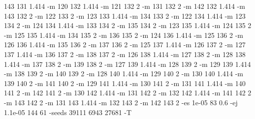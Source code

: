 \documentclass[12pt]{article}
\begin{document}
143 131 1.414 -m 120 132 1.414 -m 121 132 2 -m 131 132 2 -m 142 132 1.414 -m 143 132 2 -m 122 133 2 -m 123 133 1.414 -m 134 133 2 -m 122 134 1.414 -m 123 134 2 -m 124 134 1.414 -m 133 134 2 -m 135 134 2 -m 123 135 1.414 -m 124 135 2 -m 125 135 1.414 -m 134 135 2 -m 136 135 2 -m 124 136 1.414 -m 125 136 2 -m 126 136 1.414 -m 135 136 2 -m 137 136 2 -m 125 137 1.414 -m 126 137 2 -m 127 137 1.414 -m 136 137 2 -m 138 137 2 -m 126 138 1.414 -m 127 138 2 -m 128 138 1.414 -m 137 138 2 -m 139 138 2 -m 127 139 1.414 -m 128 139 2 -m 129 139 1.414 -m 138 139 2 -m 140 139 2 -m 128 140 1.414 -m 129 140 2 -m 130 140 1.414 -m 139 140 2 -m 141 140 2 -m 129 141 1.414 -m 130 141 2 -m 131 141 1.414 -m 140 141 2 -m 142 141 2 -m 130 142 1.414 -m 131 142 2 -m 132 142 1.414 -m 141 142 2 -m 143 142 2 -m 131 143 1.414 -m 132 143 2 -m 142 143 2 -es 1e-05 83 0.6 -ej 1.1e-05 144 61 -seeds 39111 6943 27681 -T

\newpage
\end{document}
